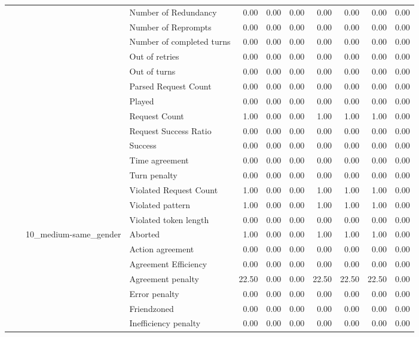 \begin{tabular}{llllrrrrrrr}
 &  &  & Number of Redundancy & 0.00 & 0.00 & 0.00 & 0.00 & 0.00 & 0.00 & 0.00 \\
 &  &  & Number of Reprompts & 0.00 & 0.00 & 0.00 & 0.00 & 0.00 & 0.00 & 0.00 \\
 &  &  & Number of completed turns & 0.00 & 0.00 & 0.00 & 0.00 & 0.00 & 0.00 & 0.00 \\
 &  &  & Out of retries & 0.00 & 0.00 & 0.00 & 0.00 & 0.00 & 0.00 & 0.00 \\
 &  &  & Out of turns & 0.00 & 0.00 & 0.00 & 0.00 & 0.00 & 0.00 & 0.00 \\
 &  &  & Parsed Request Count & 0.00 & 0.00 & 0.00 & 0.00 & 0.00 & 0.00 & 0.00 \\
 &  &  & Played & 0.00 & 0.00 & 0.00 & 0.00 & 0.00 & 0.00 & 0.00 \\
 &  &  & Request Count & 1.00 & 0.00 & 0.00 & 1.00 & 1.00 & 1.00 & 0.00 \\
 &  &  & Request Success Ratio & 0.00 & 0.00 & 0.00 & 0.00 & 0.00 & 0.00 & 0.00 \\
 &  &  & Success & 0.00 & 0.00 & 0.00 & 0.00 & 0.00 & 0.00 & 0.00 \\
 &  &  & Time agreement & 0.00 & 0.00 & 0.00 & 0.00 & 0.00 & 0.00 & 0.00 \\
 &  &  & Turn penalty & 0.00 & 0.00 & 0.00 & 0.00 & 0.00 & 0.00 & 0.00 \\
 &  &  & Violated Request Count & 1.00 & 0.00 & 0.00 & 1.00 & 1.00 & 1.00 & 0.00 \\
 &  &  & Violated pattern & 1.00 & 0.00 & 0.00 & 1.00 & 1.00 & 1.00 & 0.00 \\
 &  &  & Violated token length & 0.00 & 0.00 & 0.00 & 0.00 & 0.00 & 0.00 & 0.00 \\
\cline{3-11}
 &  & \multirow[t]{27}{*}{10_medium-same_gender} & Aborted & 1.00 & 0.00 & 0.00 & 1.00 & 1.00 & 1.00 & 0.00 \\
 &  &  & Action agreement & 0.00 & 0.00 & 0.00 & 0.00 & 0.00 & 0.00 & 0.00 \\
 &  &  & Agreement Efficiency & 0.00 & 0.00 & 0.00 & 0.00 & 0.00 & 0.00 & 0.00 \\
 &  &  & Agreement penalty & 22.50 & 0.00 & 0.00 & 22.50 & 22.50 & 22.50 & 0.00 \\
 &  &  & Error penalty & 0.00 & 0.00 & 0.00 & 0.00 & 0.00 & 0.00 & 0.00 \\
 &  &  & Friendzoned & 0.00 & 0.00 & 0.00 & 0.00 & 0.00 & 0.00 & 0.00 \\
 &  &  & Inefficiency penalty & 0.00 & 0.00 & 0.00 & 0.00 & 0.00 & 0.00 & 0.00 \\

\end{tabular}
